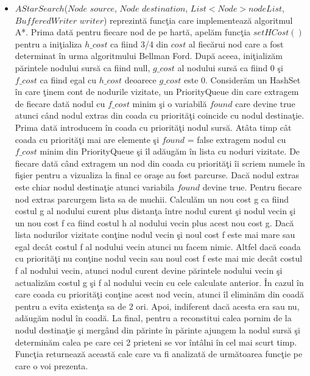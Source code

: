 \documentclass{article}
\begin{document}
\begin{itemize}
    \item $AStarSearch$($Node$ $source$, $Node$ $destination$, $List<Node> nodeList$, $BufferedWriter$ $writer$) reprezint\u{a} func\c{t}ia care implementeaz\u{a} algoritmul A*. Prima dat\u{a} pentru fiecare nod de pe hart\u{a}, apel\u{a}m func\c{t}ia $setHCost()$ pentru a ini\c{t}ializa $h\_cost$ ca fiind 3/4 din $cost$ al fiec\u{a}rui nod care a fost determinat \^{i}n urma algoritmului Bellman Ford. Dup\u{a} aceea, ini\c{t}ializ\u{a}m p\u{a}rintele nodului surs\u{a} ca fiind null, $g\_cost$ al nodului surs\u{a} ca fiind 0 \c{s}i $f\_cost$ ca fiind egal cu $h\_cost$ deoarece $g\_cost$ este 0. Consider\u{a}m un HashSet \^{i}n care \c{t}inem cont de nodurile vizitate, un PriorityQueue din care extragem de fiecare dat\u{a} nodul cu $f\_cost$ minim \c{s}i o variabil\u{a} $found$ care devine true atunci c\^{a}nd nodul extras din coada cu priorit\u{a}\c{t}i coincide cu nodul destina\c{t}ie. Prima dat\u{a} introducem \^{i}n coada cu priorit\u{a}\c{t}i nodul surs\u{a}. At\^{a}ta timp c\^{a}t coada cu priorit\u{a}\c{t}i mai are elemente \c{s}i $found$ = false extragem nodul cu $f\_cost$ minim din PriorityQueue \c{s}i \^{i}l ad\u{a}ug\u{a}m \^{i}n lista cu noduri vizitate. De fiecare dat\u{a} c\^{a}nd extragem un nod din coada cu priorit\u{a}\c{t}i \^{i}i scriem numele \^{i}n fi\c{s}ier pentru a vizualiza la final ce ora\c{s}e au fost parcurse. Dac\u{a} nodul extras este chiar nodul destina\c{t}ie atunci variabila $found$ devine true. Pentru fiecare nod extras parcurgem lista sa de muchii. Calcul\u{a}m un nou cost g ca fiind costul g al nodului curent plus distan\c{t}a \^{i}ntre nodul curent \c{s}i nodul vecin \c{s}i un nou cost f ca fiind costul h al nodului vecin plus acest nou cost g. Dac\u{a} lista nodurilor vizitate con\c{t}ine nodul vecin \c{s}i noul cost f este mai mare sau egal dec\^{a}t costul f al nodului vecin atunci nu facem nimic. Altfel dac\u{a} coada cu priorit\u{a}\c{t}i nu con\c{t}ine nodul vecin sau noul cost f este mai mic dec\^{a}t costul f al nodului vecin, atunci nodul curent devine p\u{a}rintele nodului vecin \c{s}i actualiz\u{a}m costul g \c{s}i f al nodului vecin cu cele calculate anterior. \^{I}n cazul \^{i}n care coada cu priorit\u{a}\c{t}i con\c{t}ine acest nod vecin, atunci \^{i}l elimin\u{a}m din coad\u{a} pentru a evita existen\c{t}a sa de 2 ori. Apoi, indiferent dac\u{a} acesta era sau nu, ad\u{a}ug\u{a}m nodul \^{i}n coad\u{a}. La final, pentru a reconstitui calea pornim de la nodul destina\c{t}ie \c{s}i merg\^{a}nd din p\u{a}rinte \^{i}n p\u{a}rinte ajungem la nodul surs\u{a} \c{s}i determin\u{a}m calea pe care cei 2 prieteni se vor \^{i}nt\^{a}lni \^{i}n cel mai scurt timp. Func\c{t}ia returneaz\u{a} aceast\u{a} cale care va fi analizat\u{a} de urm\u{a}toarea func\c{t}ie pe care o voi prezenta.

\end{itemize}
\end{document}

